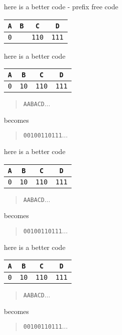 \documentclass{beamer}
\newcommand{\cred}{\color{red}}
\newcommand{\cblu}{\color{blue}}
\newcommand{\cgre}{\color{green}}
\newcommand{\letter}[1]{\color{blue}\texttt{#1}\color{black}}
\newcommand{\binary}[1]{\color{red}\texttt{#1}\color{black}}
\begin{document}
\begin{frame}{here is a better code - prefix free code}
\begin{center}
\begin{tabular}{cccc}
\letter{A}&\letter{B}&\letter{C}&\letter{D}\\
\hline
\binary{0}&\cgre{10}&\binary{110}&\binary{111}
\end{tabular}
\end{center}
\end{frame}  


\begin{frame}{here is a better code}
\begin{center}
\begin{tabular}{cccc}
\letter{A}&\letter{B}&\letter{C}&\letter{D}\\
\hline
\binary{0}&\binary{10}&\binary{110}&\binary{111}
\end{tabular}
\end{center}
  \begin{quote}
    \letter{AABACD}$\ldots$
  \end{quote}
  becomes
    \begin{quote}
    \binary{00100110111}$\ldots$
    \end{quote}
\end{frame}  

\begin{frame}{here is a better code}
\begin{center}
\begin{tabular}{cccc}
\letter{A}&\letter{B}&\letter{C}&\letter{D}\\
\hline
\binary{0}&\binary{10}&\binary{110}&\binary{111}
\end{tabular}
\end{center}
  \begin{quote}
    \letter{\cgre A\cblu{}ABACD}$\ldots$
  \end{quote}
  becomes
    \begin{quote}
    \binary{\cgre 0\cred{}0100110111}$\ldots$
    \end{quote}
\end{frame}  


\begin{frame}{here is a better code}
\begin{center}
\begin{tabular}{cccc}
\letter{A}&\letter{B}&\letter{C}&\letter{D}\\
\hline
\binary{0}&\binary{10}&\binary{110}&\binary{111}
\end{tabular}
\end{center}
  \begin{quote}
    \letter{A\cgre A\cblu{}BACD}$\ldots$
  \end{quote}
  becomes
    \begin{quote}
    \binary{0\cgre 0\cred{}100110111}$\ldots$
    \end{quote}
\end{frame}  
\end{document}
